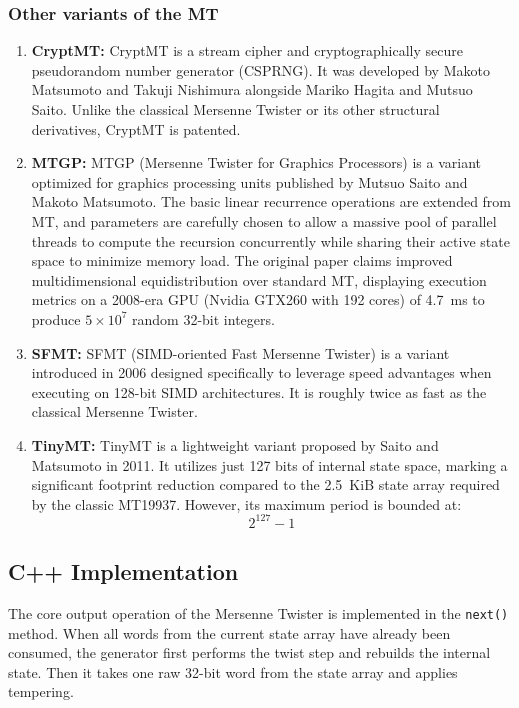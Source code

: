 \subsubsection{Other variants of the MT}
\begin{enumerate}
    \item \textbf{CryptMT:} CryptMT is a stream cipher and cryptographically secure pseudorandom number generator (CSPRNG). It was developed by Makoto Matsumoto and Takuji Nishimura alongside Mariko Hagita and Mutsuo Saito. Unlike the classical Mersenne Twister or its other structural derivatives, CryptMT is patented.
    
    \item \textbf{MTGP:} MTGP (Mersenne Twister for Graphics Processors) is a variant~\cite{saito2013mtgp} optimized for graphics processing units published by Mutsuo Saito and Makoto Matsumoto. The basic linear recurrence operations are extended from MT, and parameters are carefully chosen to allow a massive pool of parallel threads to compute the recursion concurrently while sharing their active state space to minimize memory load. The original paper claims improved multidimensional equidistribution over standard MT, displaying execution metrics on a 2008-era GPU (Nvidia GTX260 with 192 cores) of 4.7~ms to produce $5 \times 10^7$ random 32-bit integers.

    \item \textbf{SFMT:} SFMT (SIMD-oriented Fast Mersenne Twister) is a variant introduced in 2006 designed specifically to leverage speed advantages when executing on 128-bit SIMD architectures. It is roughly twice as fast as the classical Mersenne Twister. 

    \item \textbf{TinyMT:} TinyMT is a lightweight variant proposed by Saito and Matsumoto in 2011. It utilizes just 127 bits of internal state space, marking a significant footprint reduction compared to the 2.5~KiB state array required by the classic MT19937. However, its maximum period is bounded at:
    \[
    2^{127} - 1
    \]
    
\end{enumerate}



\subsection{C++ Implementation}

The core output operation of the Mersenne Twister is implemented in the \texttt{next()} method. When all words from the current state array have already been consumed, the generator first performs the twist step and rebuilds the internal state. Then it takes one raw 32-bit word from the state array and applies tempering.

